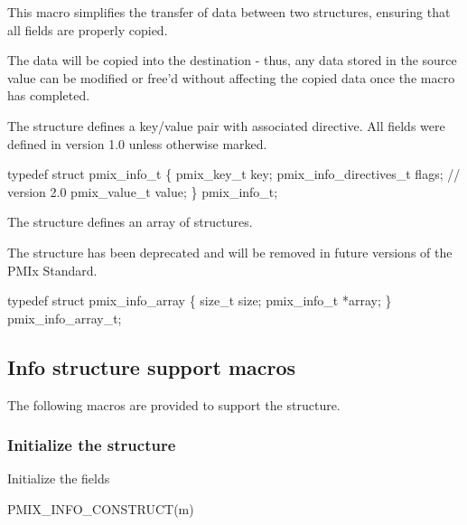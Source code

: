 \descr

This macro simplifies the transfer of data between two  structures, ensuring that all fields are properly copied.

\adviceuserstart
The data will be copied into the destination  - thus, any data stored in the source value can be modified or free'd without affecting the copied data once the macro has completed.
\adviceuserend



The  structure defines a key/value pair with associated directive. All fields were defined in version 1.0 unless otherwise marked.

\cspecificstart
\begin{codepar}
typedef struct pmix_info_t \{
    pmix_key_t key;
    pmix_info_directives_t flags;    // version 2.0
    pmix_value_t value;
\} pmix_info_t;
\end{codepar}
\cspecificend

The  structure defines an array of  structures.

\notestart
\noteheader
The  structure has been deprecated and will be removed in future versions of the \ac{PMIx} Standard.
\noteend

\cspecificstart
\begin{codepar}
typedef struct pmix_info_array \{
    size_t size;
    pmix_info_t *array;
\} pmix_info_array_t;
\end{codepar}
\cspecificend

\subsection{Info structure support macros}
The following macros are provided to support the  structure.

\subsubsection{Initialize the  structure}

Initialize the  fields

\cspecificstart
\begin{codepar}
PMIX_INFO_CONSTRUCT(m)
\end{codepar}
\cspecificend


